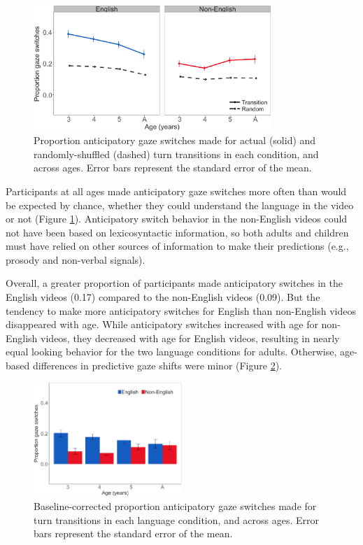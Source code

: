 \documentclass[authoryear, 12pt]{elsarticle}
\begin{document}
\begin{figure}[t]
\begin{center}
\includegraphics[width=0.8\textwidth]{figures/FIG-randvsreal-FL.png}
\end{center}
\caption{Proportion anticipatory gaze switches made for actual (solid) and randomly-shuffled (dashed) turn transitions in each condition, and across ages. Error bars represent the standard error of the mean.} 
\label{fig:randvsrealFL}
\end{figure}

Participants at all ages made anticipatory gaze switches more often than would be expected by chance, whether they could understand the language in the video or not (Figure \ref{fig:randvsrealFL}). Anticipatory switch behavior in the non-English videos could not have been based on lexicosyntactic information, so both adults and children must have relied on other sources of information to make their predictions (e.g., prosody and non-verbal signals).

Overall, a greater proportion of participants made anticipatory switches in the English videos (0.17) compared to the non-English videos (0.09). But the tendency to make more anticipatory switches for English than non-English videos disappeared with age. While anticipatory switches increased with age for non-English videos, they decreased with age for English videos, resulting in nearly equal looking behavior for the two language conditions for adults. Otherwise, age-based differences in predictive gaze shifts were minor (Figure \ref{fig:conditionsFL}).

\begin{figure}[t]
\begin{center}
\includegraphics[width=0.5\textwidth]{figures/FIG-conditions-FL.png}
\end{center}
\caption{Baseline-corrected proportion anticipatory gaze switches made for turn transitions in each language condition, and across ages. Error bars represent the standard error of the mean.} 
\label{fig:conditionsFL}
\end{figure}
\end{document}
